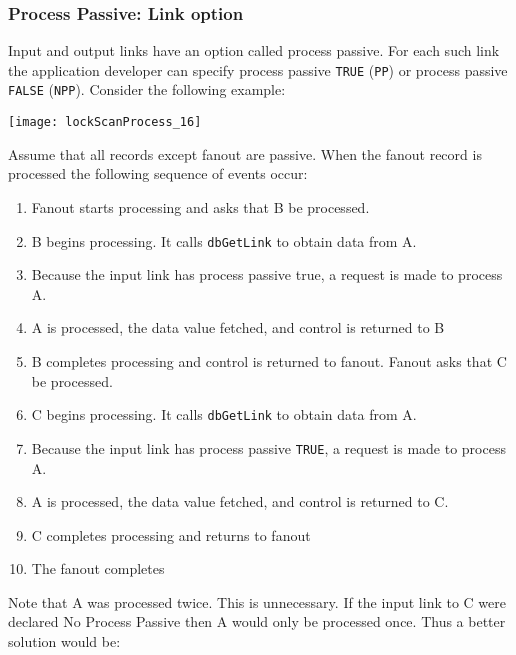 \subsubsection{Process Passive: Link option}

Input and output links have an option called process passive.
For each such link the application developer can specify process passive \verb|TRUE| (\verb|PP|) or process passive \verb|FALSE| (\verb|NPP|).
Consider the following example:

\begin{center}
\texttt{[image: lockScanProcess\_16]}
\end{center}

Assume that all records except fanout are passive.
When the fanout record is processed the following sequence of events occur:

\begin{enumerate}
\item Fanout starts processing and asks that B be processed.

\item B begins processing.
It calls \verb|dbGetLink| to obtain data from A.

\item Because the input link has process passive true, a request is made to process A.

\item A is processed, the data value fetched, and control is returned to B

\item B completes processing and control is returned to fanout.
Fanout asks that C be processed.

\item C begins processing.
It calls \verb|dbGetLink| to obtain data from A.

\item Because the input link has process passive \verb|TRUE|, a request is made to process A.

\item A is processed, the data value fetched, and control is returned to C.

\item C completes processing and returns to fanout

\item The fanout completes

\end{enumerate}

Note that A was processed twice.
This is unnecessary.
If the input link to C were declared No Process Passive then A would only be processed once.
Thus a better solution would be:

